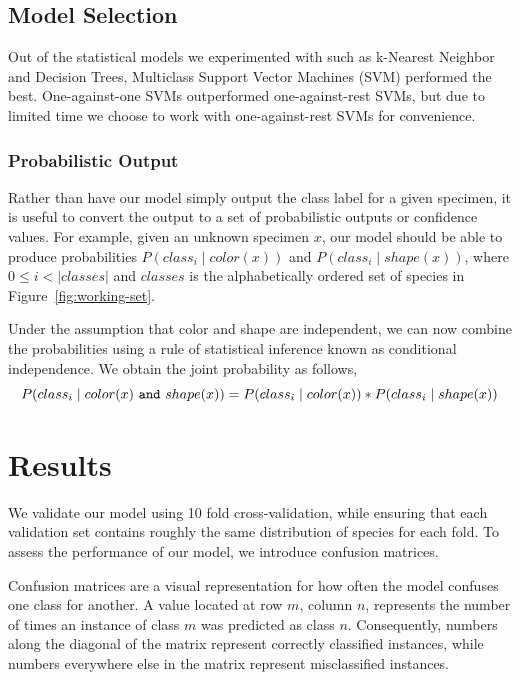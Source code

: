 \documentclass[a4paper,12pt]{article}
\begin{document}
\subsection{Model Selection}
Out of the statistical models we experimented with such as k-Nearest Neighbor and Decision Trees, Multiclass Support Vector Machines (SVM) performed the best. One-against-one SVMs outperformed one-against-rest SVMs, but due to limited time we choose to work with one-against-rest SVMs for convenience.

\subsubsection{Probabilistic Output}
Rather than have our model simply output the class label for a given specimen, it is useful to convert the output to a set of probabilistic outputs or confidence values. For example, given an unknown specimen $x$, our model should be able to produce probabilities $P(class_{i} \mid color(x))$ and $P(class_{i} \mid shape(x))$, where $0 \le i < \left|classes\right|$ and $classes$ is the alphabetically ordered set of species in Figure~\ref{fig:working-set}.

Under the assumption that color and shape are independent, we can now combine the probabilities using a rule of statistical inference known as conditional independence. We obtain the joint probability as follows,
\begin{equation}
P(class_{i} \mid color(x)~\verb#and#~shape(x)) = P(class_{i} \mid color(x)) * P(class_{i} \mid shape(x))
\label{eq:probs}
\end{equation}

\section{Results}
We validate our model using 10 fold cross-validation, while ensuring that each validation set contains roughly the same distribution of species for each fold. To assess the performance of our model, we introduce confusion matrices. 

Confusion matrices are a visual representation for how often the model confuses one class for another. A value located at row $m$, column $n$, represents the number of times an instance of class $m$ was predicted as class $n$. Consequently, numbers along the diagonal of the matrix represent correctly classified instances, while numbers everywhere else in the matrix represent misclassified instances.
\end{document}
